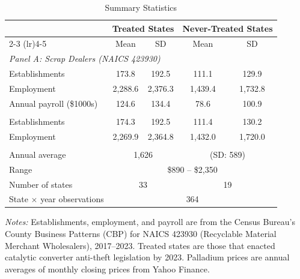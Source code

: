 \begin{table}[htbp]
\centering
\caption{Summary Statistics}
\label{tab:summary}
\begin{threeparttable}
\begin{tabular}{lcccc}
\toprule
 & \multicolumn{2}{c}{Treated States} & \multicolumn{2}{c}{Never-Treated States} \\
\cmidrule(lr){2-3} \cmidrule(lr){4-5}
 & Mean & SD & Mean & SD \\
\midrule
\multicolumn{5}{l}{\textit{Panel A: Scrap Dealers (NAICS 423930)}} \\
Establishments & 173.8 & 192.5 & 111.1 & 129.9 \\
Employment & 2,288.6 & 2,376.3 & 1,439.4 & 1,732.8 \\
Annual payroll (\$1000s) & 124.6 & 134.4 & 78.6 & 100.9 \\
\addlinespace
\multicolumn{5}{l}{\textit{Panel B: Pre-Treatment Means (2017--2021)}} \\
Establishments & 174.3 & 192.5 & 111.4 & 130.2 \\
Employment & 2,269.9 & 2,364.8 & 1,432.0 & 1,720.0 \\
\addlinespace
\multicolumn{5}{l}{\textit{Panel C: Palladium Prices (\$/oz, 2017--2023)}} \\
Annual average & \multicolumn{2}{c}{1,626} & \multicolumn{2}{c}{(SD: 589)} \\
Range & \multicolumn{4}{c}{\$890 -- \$2,350} \\
\addlinespace
Number of states & \multicolumn{2}{c}{33} & \multicolumn{2}{c}{19} \\
State $\times$ year observations & \multicolumn{4}{c}{364} \\
\bottomrule
\end{tabular}
\begin{tablenotes}[flushleft]
\small
\item \textit{Notes:} Establishments, employment, and payroll are from the Census Bureau's County Business Patterns (CBP) for NAICS 423930 (Recyclable Material Merchant Wholesalers), 2017--2023. Treated states are those that enacted catalytic converter anti-theft legislation by 2023. Palladium prices are annual averages of monthly closing prices from Yahoo Finance.
\end{tablenotes}
\end{threeparttable}
\end{table}

